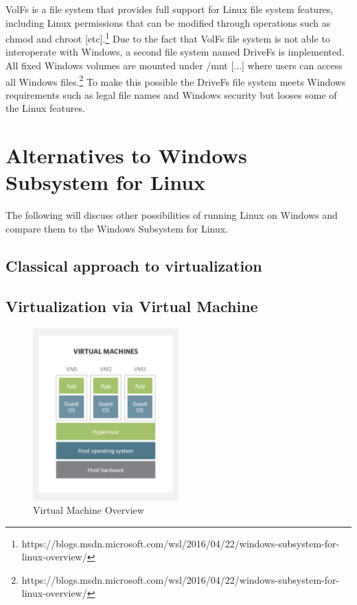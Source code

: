 \documentclass[utf8,biblatex]{lni}
\begin{document}
\glqq VolFs is a file system that provides full support for Linux file system features, including Linux permissions that can be modified through operations such as chmod and chroot [etc].\glqq \footnote{https://blogs.msdn.microsoft.com/wsl/2016/04/22/windows-subsystem-for-linux-overview/} Due to the fact that VolFs file system is not able to interoperate with Windows, a second file system named DriveFs is implemented. \glqq All fixed Windows volumes are mounted under /mnt [...] where users can access all Windows files.\glqq \footnote{https://blogs.msdn.microsoft.com/wsl/2016/04/22/windows-subsystem-for-linux-overview/} To make this possible the DriveFs file system meets Windows requirements such as legal file names and Windows security but looses some of the Linux features.

\section{Alternatives to Windows Subsystem for Linux}
The following will discuss other possibilities of running Linux on Windows and compare them to the Windows Subsystem for Linux.

\subsection{Classical approach to virtualization}

\subsection{Virtualization via Virtual Machine}

\begin{figure}
  \centering
  \includegraphics[width=0.5\textwidth]{VM.pdf}
  \caption{Virtual Machine Overview}
  \label{img:vm}
\end{figure}
\end{document}
